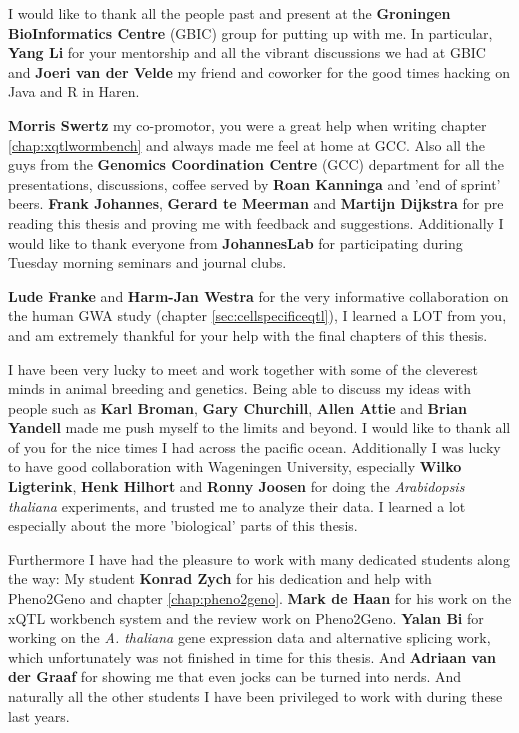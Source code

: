 I would like to thank all the people past and present at the {\bf Groningen BioInformatics Centre} 
(GBIC) group for putting up with me. In particular, {\bf Yang Li} for your mentorship and all the 
vibrant discussions we had at GBIC and {\bf Joeri van der Velde} my friend and coworker for the 
good times hacking on Java and R in Haren.

{\bf Morris Swertz} my co-promotor, you were a great help when writing chapter \ref{chap:xqtlwormbench} 
and always made me feel at home at GCC. Also all the guys from the {\bf Genomics Coordination 
Centre} (GCC) department for all the presentations, discussions, coffee served by {\bf Roan Kanninga} and 'end of sprint' beers. 
{\bf Frank Johannes}, {\bf Gerard te Meerman} and {\bf Martijn Dijkstra} for pre reading this thesis and proving me 
with feedback and suggestions. Additionally I would like to thank everyone from {\bf JohannesLab} for participating during Tuesday morning 
seminars and journal clubs. 

{\bf Lude Franke} and {\bf Harm-Jan Westra} for the very informative collaboration on the 
human GWA study (chapter \ref{sec:cellspecificeqtl}), I learned a LOT from you, and am 
extremely thankful for your help with the final chapters of this thesis. 

I have been very lucky to meet and work together with some of the cleverest minds in animal breeding 
and genetics. Being able to discuss my ideas with people such as {\bf Karl Broman}, {\bf Gary Churchill}, 
{\bf Allen Attie} and {\bf Brian Yandell} made me push myself to the limits and beyond. I would like 
to thank all of you for the nice times I had across the pacific ocean. 
Additionally I was lucky to have good collaboration with Wageningen University, especially {\bf Wilko 
Ligterink}, {\bf Henk Hilhort} and {\bf Ronny Joosen} for doing the \emph{Arabidopsis thaliana} 
experiments, and trusted me to analyze their data. I learned a lot especially about the more 'biological' 
parts of this thesis. 

Furthermore I have had the pleasure to work with many dedicated students along the way: 
My student {\bf Konrad Zych} for his dedication and help with Pheno2Geno and chapter \ref{chap:pheno2geno}. 
{\bf Mark de Haan} for his work on the xQTL workbench system and the review work on Pheno2Geno.
{\bf Yalan Bi} for working on the \emph{A. thaliana} gene expression data and alternative splicing 
work, which unfortunately was not finished in time for this thesis. And {\bf Adriaan van der Graaf} for 
showing me that even jocks can be turned into nerds. And naturally all the other students I have been 
privileged to work with during these last years.

